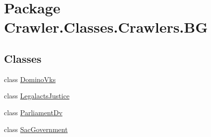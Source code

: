 \hypertarget{namespace_crawler_1_1_classes_1_1_crawlers_1_1_b_g}{\section{Package Crawler.\-Classes.\-Crawlers.\-B\-G}
\label{namespace_crawler_1_1_classes_1_1_crawlers_1_1_b_g}
}
\subsection*{Classes}
\begin{DoxyCompactItemize}
\item 
class \hyperlink{class_crawler_1_1_classes_1_1_crawlers_1_1_b_g_1_1_domino_vks}{Domino\-Vks}
\item 
class \hyperlink{class_crawler_1_1_classes_1_1_crawlers_1_1_b_g_1_1_legalacts_justice}{Legalacts\-Justice}
\item 
class \hyperlink{class_crawler_1_1_classes_1_1_crawlers_1_1_b_g_1_1_parliament_dv}{Parliament\-Dv}
\item 
class \hyperlink{class_crawler_1_1_classes_1_1_crawlers_1_1_b_g_1_1_sac_government}{Sac\-Government}
\end{DoxyCompactItemize}
